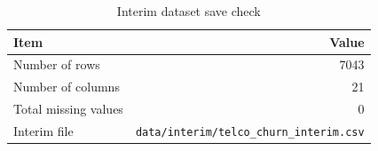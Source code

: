 \begin{table}[H]
\centering
\caption{Interim dataset save check}
\label{tab:interim-save-check}
\begin{tabular}{lr}
\toprule
Item & Value \\
\midrule
Number of rows & 7043 \\
Number of columns & 21 \\
Total missing values & 0 \\
Interim file & \texttt{data/interim/telco\_churn\_interim.csv} \\
\bottomrule
\end{tabular}
\end{table}
